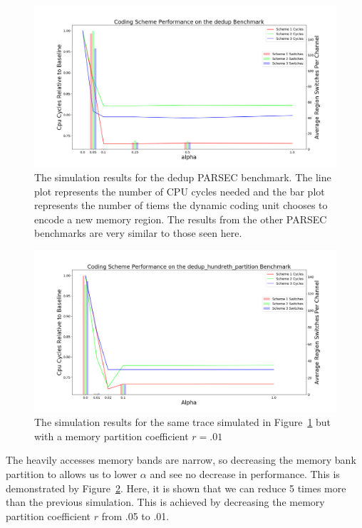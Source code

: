 \begin{figure}[htbp]
		\includegraphics[width=\linewidth]{fig/dedup_benchmark_results.png}
		\caption{The simulation results for the dedup PARSEC benchmark. The line plot represents the number of CPU cycles needed and the bar plot represents the number of tiems the dynamic coding unit chooses to encode a new memory region. The results from the other PARSEC benchmarks are very similar to those seen here.}
		\label{fig:dedup_results}
\end{figure}

\begin{figure}[htbp]
		\includegraphics[width=\linewidth]{fig/dedup_hundreth.png}
		\caption{The simulation results for the same trace simulated in Figure~\ref{fig:dedup_results} but with a memory partition coefficient $r = .01$}
		\label{fig:dedup_hundreth}
\end{figure}

The heavily accesses memory bands are narrow, so decreasing the memory bank partition to allows us to lower $\alpha$ and see no decrease in performance. This is demonstrated by Figure~\ref{fig:dedup_hundreth}. Here, it is shown that we can reduce 5 times more than the previous simulation. This is achieved by decreasing the memory partition coefficient $r$ from .05 to .01.


